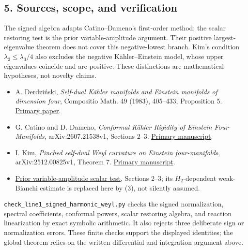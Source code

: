 \documentclass[
  11pt,
]{article}
\providecommand{\tightlist}{%
  \setlength{\itemsep}{0pt}\setlength{\parskip}{0pt}}
\begin{document}
\hypertarget{sources-scope-and-verification}{%
\subsection{5. Sources, scope, and
verification}\label{sources-scope-and-verification}}

The signed algebra adapts Catino--Dameno's first-order method; the
scalar restoring test is the prior variable-amplitude argument. Their
positive largest-eigenvalue theorem does not cover this negative-lowest
branch. Kim's condition \(\lambda_2\le\lambda_3/4\) also excludes the
negative Kähler--Einstein model, whose upper eigenvalues coincide and
are positive. These distinctions are mathematical hypotheses, not
novelty claims.

\begin{itemize}
\tightlist
\item
  A. Derdziński, \emph{Self-dual Kähler manifolds and Einstein manifolds
  of dimension four}, Compositio Math. 49 (1983), 405--433, Proposition
  5.
  \href{https://www.numdam.org/article/CM_1983__49_3_405_0.pdf}{Primary
  paper}.
\item
  G. Catino and D. Dameno, \emph{Conformal Kähler Rigidity of Einstein
  Four-Manifolds}, arXiv:2607.21538v1, Sections 2--3.
  \href{https://arxiv.org/html/2607.21538v1}{Primary manuscript}.
\item
  I. Kim, \emph{Pinched self-dual Weyl curvature on Einstein
  four-manifolds}, arXiv:2512.00825v1, Theorem 7.
  \href{https://arxiv.org/html/2512.00825v1}{Primary manuscript}.
\item
  \href{line1_variable_negative_selection.md}{Prior variable-amplitude
  scalar test}, Sections 2--3; its \(H_2\)-dependent weak-Bianchi
  estimate is replaced here by (3), not silently assumed.
\end{itemize}

\texttt{check\_line1\_signed\_harmonic\_weyl.py} checks the signed
normalization, spectral coefficients, conformal powers, scalar restoring
algebra, and reaction linearization by exact symbolic arithmetic. It
also rejects three deliberate sign or normalization errors. These finite
checks support the displayed identities; the global theorem relies on
the written differential and integration argument above.
\end{document}
